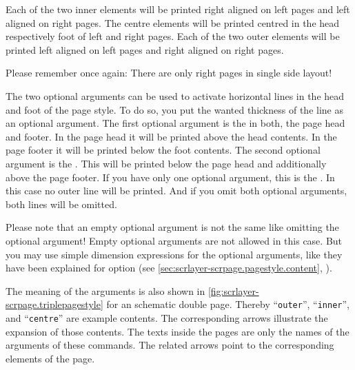 Each of the two inner elements will be printed right aligned on left pages and
left aligned on right pages. The centre elements will be printed centred in
the head respectively foot of left and right pages. Each of the two outer
elements will be printed left aligned on left pages and right aligned on right
pages.

Please remember once again: There are only right pages in
single side layout!

The two optional arguments can be used to activate horizontal lines in the
head and foot of the page style. To do so, you put the wanted thickness of the
line as an optional argument. The first optional argument is the
 in both, the page head and footer. In the
page head it will be printed above the head contents. In the page footer it
will be printed below the foot contents. The second optional argument is the
. This will be printed below the page head
and additionally above the page footer. If you have only one optional
argument, this is the . In this case no
outer line will be printed. And if you omit both optional arguments, both
lines will be omitted.

Please note that an empty optional argument is not the
same like omitting the optional argument! Empty optional arguments are not
allowed in this case. But you may use simple dimension expressions for the
optional arguments, like they have been explained for \KOMAScript{} option
 (see \autoref{sec:scrlayer-scrpage.pagestyle.content},
).

The meaning of the arguments is also shown in
\autoref{fig:scrlayer-scrpage.triplepagestyle} for an schematic double
page. Thereby ``\texttt{outer}'', ``\texttt{inner}'', and ``\texttt{centre}''
are example contents. The corresponding arrows illustrate the expansion of
those contents. The texts inside the pages are only the
names of the arguments of these commands. The related arrows  point to the corresponding elements of the page.

